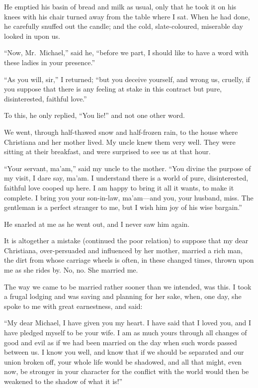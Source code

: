 He emptied his basin of bread and milk as usual, only that he took
it on his knees with his chair turned away from the table where I
sat.  When he had done, he carefully snuffed out the candle; and the
cold, slate-coloured, miserable day looked in upon us.

``Now, Mr.\ Michael,'' said he, ``before we part, I should like to have
a word with these ladies in your presence.''

``As you will, sir,'' I returned; ``but you deceive yourself, and wrong
us, cruelly, if you suppose that there is any feeling at stake in
this contract but pure, disinterested, faithful love.''

To this, he only replied, ``You lie!'' and not one other word.

We went, through half-thawed snow and half-frozen rain, to the house
where Christiana and her mother lived.  My uncle knew them very
well.  They were sitting at their breakfast, and were surprised to
see us at that hour.

``Your servant, ma'am,'' said my uncle to the mother.  ``You divine the
purpose of my visit, I dare say, ma'am.  I understand there is a
world of pure, disinterested, faithful love cooped up here.  I am
happy to bring it all it wants, to make it complete.  I bring you
your son-in-law, ma'am---and you, your husband, miss.  The gentleman
is a perfect stranger to me, but I wish him joy of his wise
bargain.''

He snarled at me as he went out, and I never saw him again.


It is altogether a mistake (continued the poor relation) to suppose
that my dear Christiana, over-persuaded and influenced by her
mother, married a rich man, the dirt from whose carriage wheels is
often, in these changed times, thrown upon me as she rides by.  No,
no.  She married me.

The way we came to be married rather sooner than we intended, was
this.  I took a frugal lodging and was saving and planning for her
sake, when, one day, she spoke to me with great earnestness, and
said:

``My dear Michael, I have given you my heart.  I have said that I
loved you, and I have pledged myself to be your wife.  I am as much
yours through all changes of good and evil as if we had been married
on the day when such words passed between us.  I know you well, and
know that if we should be separated and our union broken off, your
whole life would be shadowed, and all that might, even now, be
stronger in your character for the conflict with the world would
then be weakened to the shadow of what it is!''

